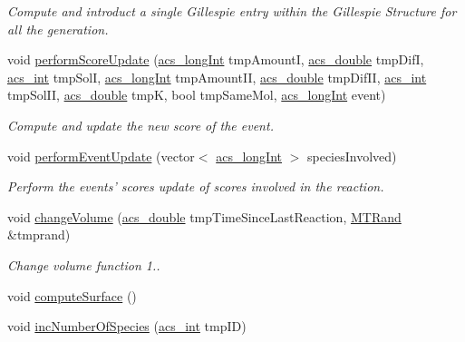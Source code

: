 \begin{DoxyCompactItemize}
\begin{DoxyCompactList}\small\item\em Compute and introduct a single Gillespie entry within the Gillespie Structure for all the generation. \end{DoxyCompactList}\item 
void \hyperlink{a00011_ad25f6aa3ab2ac6097f57828bcf78e5c9}{perform\-Score\-Update} (\hyperlink{a00024_a19319d75f02db4308bc5c0026d98cd85}{acs\-\_\-long\-Int} tmp\-Amount\-I, \hyperlink{a00024_ab776853a005fcbf56af0424a2a4dd607}{acs\-\_\-double} tmp\-Dif\-I, \hyperlink{a00024_a8d277355641a098190360234e2ebde35}{acs\-\_\-int} tmp\-Sol\-I, \hyperlink{a00024_a19319d75f02db4308bc5c0026d98cd85}{acs\-\_\-long\-Int} tmp\-Amount\-I\-I, \hyperlink{a00024_ab776853a005fcbf56af0424a2a4dd607}{acs\-\_\-double} tmp\-Dif\-I\-I, \hyperlink{a00024_a8d277355641a098190360234e2ebde35}{acs\-\_\-int} tmp\-Sol\-I\-I, \hyperlink{a00024_ab776853a005fcbf56af0424a2a4dd607}{acs\-\_\-double} tmp\-K, bool tmp\-Same\-Mol, \hyperlink{a00024_a19319d75f02db4308bc5c0026d98cd85}{acs\-\_\-long\-Int} event)
\begin{DoxyCompactList}\small\item\em Compute and update the new score of the event. \end{DoxyCompactList}\item 
void \hyperlink{a00011_ae7ef2ef3277e15e1644496e118ebb9bc}{perform\-Event\-Update} (vector$<$ \hyperlink{a00024_a19319d75f02db4308bc5c0026d98cd85}{acs\-\_\-long\-Int} $>$ species\-Involved)
\begin{DoxyCompactList}\small\item\em Perform the events' scores update of scores involved in the reaction. \end{DoxyCompactList}\item 
void \hyperlink{a00011_a4dfd9bff19e6026f3b4b35af5cedac9a}{change\-Volume} (\hyperlink{a00024_ab776853a005fcbf56af0424a2a4dd607}{acs\-\_\-double} tmp\-Time\-Since\-Last\-Reaction, \hyperlink{a00016}{M\-T\-Rand} \&tmprand)
\begin{DoxyCompactList}\small\item\em Change volume function  1.. \end{DoxyCompactList}\item 
void \hyperlink{a00011_a4526a2b544fe9dc2d174d2699bead876}{compute\-Surface} ()
\item 
void \hyperlink{a00011_a9fdf3a3b16809edd87c1b1963ef0a67f}{inc\-Number\-Of\-Species} (\hyperlink{a00024_a8d277355641a098190360234e2ebde35}{acs\-\_\-int} tmp\-I\-D)

\end{DoxyCompactItemize}
